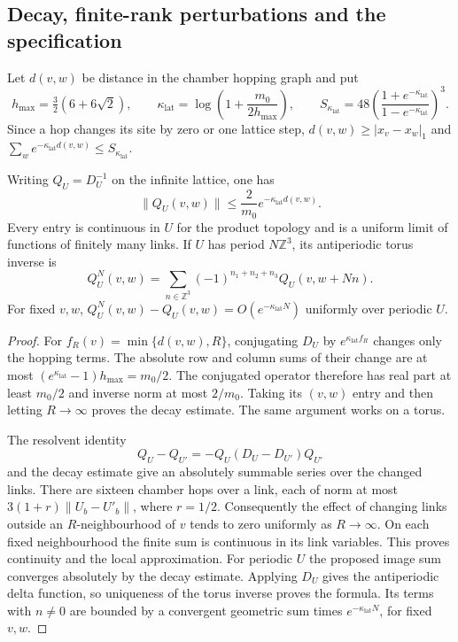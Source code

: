 \documentclass[11pt,letterpaper,reqno]{amsart}
\makeatletter
\theoremstyle{definition}
\newcommand{\ms@minorstart}{%
  \pushQED{\qed}\renewcommand{\qedsymbol}{$\blacksquare$}}
\newenvironment{lemma}[1][]{\ms@minorstart\ms@lemma[#1]}
  {\popQED\endms@lemma}
\theoremstyle{remark}
\makeatother
\begin{document}
\subsection{Decay, finite-rank perturbations and the specification}

Let $d(v,w)$ be distance in the chamber hopping graph and put
\[
 h_{\max}=\tfrac32(6+6\sqrt2),\qquad
 \kappa_{\mathrm{lat}}=\log\left(1+\frac{m_0}{2h_{\max}}\right),\qquad
 S_{\kappa_{\mathrm{lat}}}=48\left(\frac{1+e^{-\kappa_{\mathrm{lat}}}}{1-e^{-\kappa_{\mathrm{lat}}}}\right)^3.
\]
Since a hop changes its site by zero or one lattice step,
$d(v,w)\ge|x_v-x_w|_1$ and
$\sum_we^{-\kappa_{\mathrm{lat}} d(v,w)}\le S_{\kappa_{\mathrm{lat}}}$.

\begin{lemma}[The propagator at a fixed configuration]
\label{C-389-9}
Writing $Q_U=D_U^{-1}$ on the infinite lattice, one has
\[
 \|Q_U(v,w)\|\le\frac2{m_0}e^{-\kappa_{\mathrm{lat}} d(v,w)}.
\]
Every entry is continuous in $U$ for the product topology and is a
uniform limit of functions of finitely many links. If $U$ has period
$N\mathbb Z^3$, its antiperiodic torus inverse is
\[
 Q_U^N(v,w)=\sum_{n\in\mathbb Z^3}(-1)^{n_1+n_2+n_3}
                                    Q_U(v,w+Nn).
\]
For fixed $v,w$, $Q_U^N(v,w)-Q_U(v,w)=O(e^{-\kappa_{\mathrm{lat}} N})$
uniformly over periodic $U$.
\end{lemma}

\begin{proof}
For $f_R(v)=\min\{d(v,w),R\}$, conjugating $D_U$ by
$e^{\kappa_{\mathrm{lat}} f_R}$ changes only the hopping terms. The absolute
row and column sums of their change are at most
$(e^{\kappa_{\mathrm{lat}}}-1)h_{\max}=m_0/2$. The conjugated operator therefore
has real part at least $m_0/2$ and inverse norm at most $2/m_0$.
Taking its $(v,w)$ entry and then letting $R\to\infty$ proves
the decay estimate. The same argument works on a torus.

The resolvent identity
\[
 Q_U-Q_{U'}=-Q_U(D_U-D_{U'})Q_{U'}
\]
and the decay estimate give an absolutely summable series over the
changed links. There are sixteen chamber hops over a link, each
of norm at most $3(1+r)\|U_b-U'_b\|$, where $r=1/2$.
Consequently the effect of changing links outside an $R$-neighbourhood
of $v$ tends to zero uniformly as $R\to\infty$.
On each fixed neighbourhood the finite sum is continuous in its
link variables. This proves continuity and the local approximation.
For periodic $U$ the proposed image sum converges absolutely by
the decay estimate. Applying $D_U$ gives the antiperiodic delta
function, so uniqueness of the torus inverse proves the formula.
Its terms with $n\ne0$ are bounded by a convergent geometric sum
times $e^{-\kappa_{\mathrm{lat}} N}$, for fixed $v,w$.
\end{proof}
\end{document}
